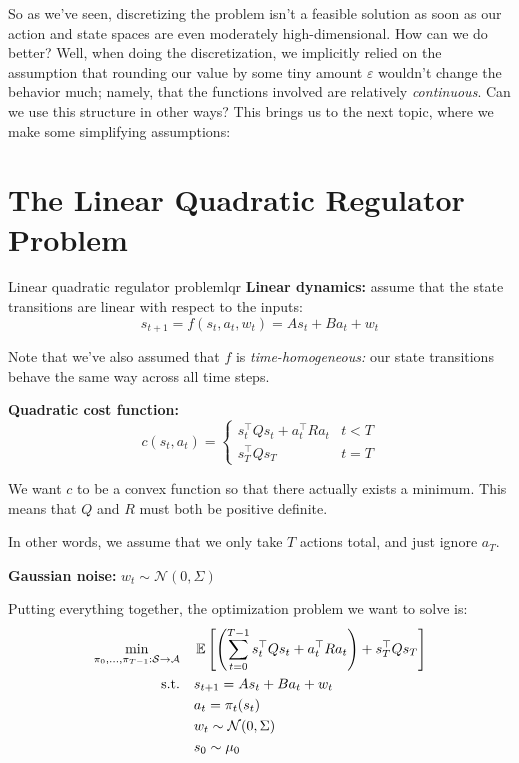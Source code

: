 \documentclass[../main/main]{subfiles}
\begin{document}
So as we've seen, discretizing the problem isn't a feasible solution as soon as
our action and state spaces are even moderately high-dimensional.
How can we do better?
Well, when doing the discretization, we implicitly relied on the assumption
that rounding our value by some tiny amount $\varepsilon$ wouldn't change the
behavior much; namely, that the functions involved are relatively
\emph{continuous}.
Can we use this structure in other ways? This brings us to the next topic,
where we make some simplifying assumptions:

\section{The Linear Quadratic Regulator Problem} \label{sec:lqr}


\begin{definition}{Linear quadratic regulator problem}{lqr}
    \textbf{Linear dynamics:} assume that the state transitions are linear with
    respect to the inputs: \[
        s_{t+1} = f(s_t, a_t, w_t) = A s_t + B a_t + w_t
    \]

    Note that we've also assumed that $f$ is \emph{time-homogeneous:} our
    state transitions behave the same way across all time steps.

    \textbf{Quadratic cost function:} \[
        c(s_t, a_t) = \begin{cases}
            s_t^\top Q s_t + a_t^\top R a_t & t < T \\
            s_T^\top Q s_T & t = T
        \end{cases}
    \]

    We want $c$ to be a convex function so that there actually exists
    a minimum. This means that $Q$ and $R$ must both be positive definite.

    In other words, we assume that we only take $T$ actions total, and just ignore $a_T$.

    \textbf{Gaussian noise:} $w_t \sim \mathcal{N}(0, \Sigma)$

    Putting everything together, the optimization problem we want to solve is:
    \begin{align*}
        \min_{\pi_0, \dots, \pi_{T-1} : \mathcal{S} \to \mathcal{A}} \quad & \operatorname*{\mathbb{E}} \left[ \left( \sum_{t=0}^{T-1} s_t^\top Q s_t + a_t^\top R a_t \right) + s_T^\top Q s_T \right] \\
        \textrm{s.t.} \quad & s_{t+1} = A s_t + B a_t + w_t \\
        & a_t = \pi_t (s_t) \\
        & w_t \sim \mathcal{N}(0, \Sigma) \\
        & s_0 \sim \mu_0
    \end{align*}
\end{definition}
\end{document}
